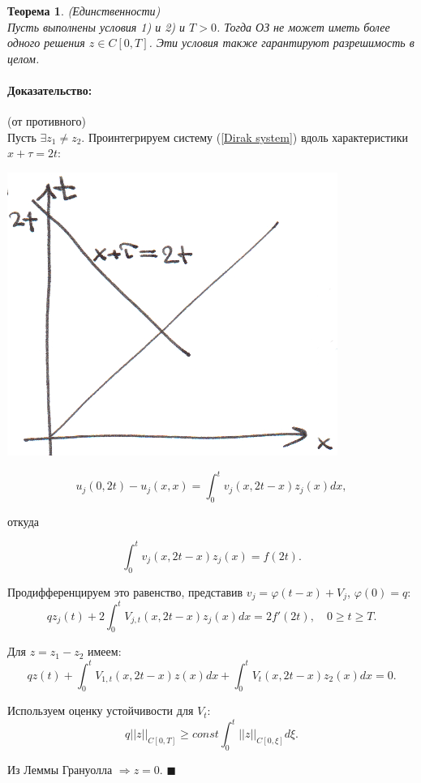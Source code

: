 \documentclass{article}
\newtheorem{theorem}{Теорема}
\newenvironment{proof}{\paragraph{Доказательство:}}{\hfill$\blacksquare$}
\begin{document}
\begin{theorem}
(Единственности)\\
Пусть выполнены условия 1) и 2) и $T > 0$. Тогда ОЗ не может иметь более одного решения $z \in C[0,T]$. Эти условия также гарантируют разрешимость в целом.
\end{theorem}
\begin{proof}
(от противного)\\
Пусть $\exists z_1 \neq z_2$. Проинтегрируем систему (\ref{Dirak system}) вдоль характеристики $x + \tau = 2t$:

\includegraphics[scale=0.8]{pic9_3.png}

\begin{equation*}
	u_j(0,2t) - u_j(x,x) = \int_0^t v_j(x,2t - x) z_j(x) dx,
\end{equation*}

откуда

\begin{equation*}
	\int_0^t v_j(x,2t-x) z_j(x) = f(2t).
\end{equation*}

Продифференцируем это равенство, представив $v_j = \varphi(t-x) + V_j$, $\varphi(0) = q$:
\begin{equation*}
	q z_j(t) + 2 \int_0^t V_{j,t} (x,2t -x) z_j(x) dx = 2f'(2t), \quad 0\geqslant t \geqslant T.
\end{equation*}

Для $z = z_1 - z_2$ имеем:
\begin{equation*}
	q z(t) + \int_0^t V_{1,t} (x,2t-x) z(x) dx + \int_0^t V_t (x,2t-x) z_2(x) dx = 0.
\end{equation*}

Используем оценку устойчивости для $V_t$:
\begin{equation*}
	q||z||_{C[0,T]} \geqslant const \int_0^t ||z||_{C[0,\xi]} d\xi.
\end{equation*}

Из Леммы Грануолла $\Rightarrow z = 0$.
\end{proof}
\end{document}
